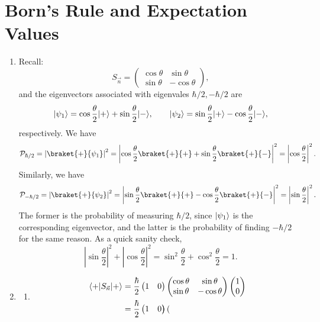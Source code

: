 \documentclass[11pt, letterpaper]{article}
\begin{document}
\section{Born's Rule and Expectation Values}
\begin{enumerate}
	\item Recall:
		\[
			S_{\vec{n} } =\begin{pmatrix}
			\cos \theta  & \sin \theta  \\
			\sin \theta  & -\cos \theta 
			\end{pmatrix},
		\]
		and the eigenvectors associated with eigenvales $\hbar /2,-\hbar /2$ are
		\[
			\lvert\psi _1\rangle =\cos \frac{\theta }{2} \lvert+\rangle +\sin \frac{\theta }{2} \lvert-\rangle ,\qquad \lvert\psi _2\rangle =\sin \frac{\theta }{2} \lvert+\rangle -\cos \frac{\theta }{2} \lvert-\rangle ,
		\]
		respectively. We have
		\[
			\mathcal{P}_{\hbar /2} =\left| \braket{+}{\psi_1}  \right|^2=\left| \cos \frac{\theta }{2} \braket{+}{+} +\sin \frac{\theta }{2} \braket{+}{-}  \right| ^2=\left| \cos \frac{\theta }{2}  \right| ^2
		.\]
		Similarly, we have
		\[
			\mathcal{P}_{-\hbar /2} =\left| \braket{+}{\psi_2}  \right| ^2=\left| \sin \frac{\theta }{2} \braket{+}{+} -\cos \frac{\theta }{2} \braket{+}{-}  \right| ^2 = \left| \sin \frac{\theta }{2}  \right|^2
		.\]
		The former is the probability of measuring $\hbar /2$, since $\lvert\psi _1\rangle $ is the corresponding eigenvector, and the latter is the probability of finding $-\hbar /2$ for the same reason. As a quick sanity check,
		\[
			\left| \sin \frac{\theta }{2}  \right| ^2+\left| \cos \frac{\theta }{2}  \right| ^2=\sin ^2\frac{\theta }{2} +\cos ^2\frac{\theta }{2} =1
		.\]
	\item 
		\begin{enumerate}
			\item
				\begin{align*}
					\langle+\rvert S_{\vec{n} } \lvert+\rangle &=\frac{\hbar }{2} \begin{pmatrix}
					1 & 0
					\end{pmatrix} \begin{pmatrix}
					\cos \theta  & \sin \theta  \\
					\sin \theta  & -\cos \theta 
					\end{pmatrix}\begin{pmatrix}
					1 \\
					0
					\end{pmatrix}\\
								     &=\frac{\hbar }{2} \begin{pmatrix}
								     1 & 0
								     \end{pmatrix}\begin{pmatrix}

\end{pmatrix}
\end{align*}
\end{enumerate}
\end{enumerate}
\end{document}
